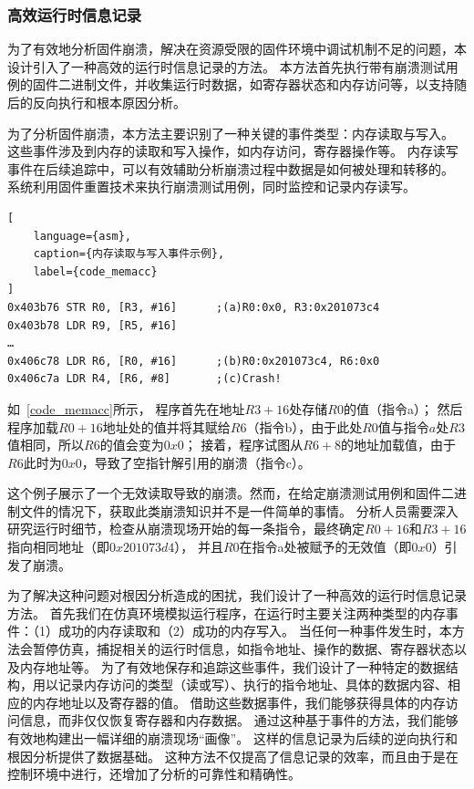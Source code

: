 \subsubsection{高效运行时信息记录}
为了有效地分析固件崩溃，解决在资源受限的固件环境中调试机制不足的问题，本设计引入了一种高效的运行时信息记录的方法。
本方法首先执行带有崩溃测试用例的固件二进制文件，并收集运行时数据，如寄存器状态和内存访问等，以支持随后的反向执行和根本原因分析。

为了分析固件崩溃，本方法主要识别了一种关键的事件类型：内存读取与写入。
这些事件涉及到内存的读取和写入操作，如内存访问，寄存器操作等。
内存读写事件在后续追踪中，可以有效辅助分析崩溃过程中数据是如何被处理和转移的。
系统利用固件重置技术来执行崩溃测试用例，同时监控和记录内存读写。
\begin{lstlisting}[
    language={asm},
    caption={内存读取与写入事件示例},
    label={code_memacc}
]
0x403b76 STR R0, [R3, #16]      ;(a)R0:0x0, R3:0x201073c4
0x403b78 LDR R9, [R5, #16]
…
0x406c78 LDR R6, [R0, #16]      ;(b)R0:0x201073c4, R6:0x0
0x406c7a LDR R4, [R6, #8]       ;(c)Crash!
\end{lstlisting}

如~\autoref{code_memacc}所示， 程序首先在地址$R3 + 16$处存储$R0$的值（指令a）；
然后程序加载$R0 + 16$地址处的值并将其赋给$R6$（指令b），由于此处$R0$值与指令$a$处$R3$值相同，所以$R6$的值会变为$0x0$；
接着，程序试图从$R6 + 8$的地址加载值，由于$R6$此时为$0x0$，导致了空指针解引用的崩溃（指令c）。

这个例子展示了一个无效读取导致的崩溃。然而，在给定崩溃测试用例和固件二进制文件的情况下，获取此类崩溃知识并不是一件简单的事情。
分析人员需要深入研究运行时细节，检查从崩溃现场开始的每一条指令，最终确定$R0 + 16$和$R3 + 16$指向相同地址（即$0x201073d4$），
并且$R0$在指令a处被赋予的无效值（即$0x0$）引发了崩溃。

为了解决这种问题对根因分析造成的困扰，我们设计了一种高效的运行时信息记录方法。
首先我们在仿真环境模拟运行程序，在运行时主要关注两种类型的内存事件：（1）成功的内存读取和（2）成功的内存写入。
当任何一种事件发生时，本方法会暂停仿真，捕捉相关的运行时信息，如指令地址、操作的数据、寄存器状态以及内存地址等。
为了有效地保存和追踪这些事件，我们设计了一种特定的数据结构，用以记录内存访问的类型（读或写）、执行的指令地址、具体的数据内容、相应的内存地址以及寄存器的值。
借助这些数据事件，我们能够获得具体的内存访问信息，而非仅仅恢复寄存器和内存数据。
通过这种基于事件的方法，我们能够有效地构建出一幅详细的崩溃现场“画像”。
这样的信息记录为后续的逆向执行和根因分析提供了数据基础。
这种方法不仅提高了信息记录的效率，而且由于是在控制环境中进行，还增加了分析的可靠性和精确性。
